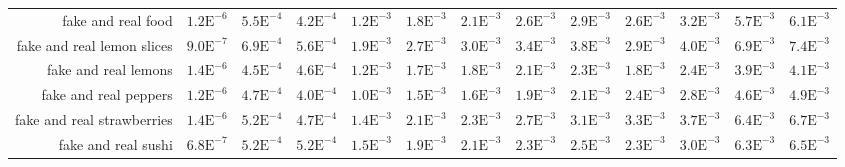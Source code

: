 \begin{landscape}
\begin{table}
\begin{tabularx}{\linewidth}{r | rr | rrrrrr | rrrr}
        fake and real food  & \footnotesize{$1.2\mathrm{E}^{-6}$}& \footnotesize{$5.5\mathrm{E}^{-4}$}& \footnotesize{$4.2\mathrm{E}^{-4}$}& \footnotesize{$1.2\mathrm{E}^{-3}$}& \footnotesize{$1.8\mathrm{E}^{-3}$}& \footnotesize{$2.1\mathrm{E}^{-3}$}& \footnotesize{$2.6\mathrm{E}^{-3}$}& \footnotesize{$2.9\mathrm{E}^{-3}$}& \footnotesize{$2.6\mathrm{E}^{-3}$}& \footnotesize{$3.2\mathrm{E}^{-3}$}& \footnotesize{$5.7\mathrm{E}^{-3}$}& \footnotesize{$6.1\mathrm{E}^{-3}$}\\
        fake and real lemon slices  & \footnotesize{$9.0\mathrm{E}^{-7}$}& \footnotesize{$6.9\mathrm{E}^{-4}$}& \footnotesize{$5.6\mathrm{E}^{-4}$}& \footnotesize{$1.9\mathrm{E}^{-3}$}& \footnotesize{$2.7\mathrm{E}^{-3}$}& \footnotesize{$3.0\mathrm{E}^{-3}$}& \footnotesize{$3.4\mathrm{E}^{-3}$}& \footnotesize{$3.8\mathrm{E}^{-3}$}& \footnotesize{$2.9\mathrm{E}^{-3}$}& \footnotesize{$4.0\mathrm{E}^{-3}$}& \footnotesize{$6.9\mathrm{E}^{-3}$}& \footnotesize{$7.4\mathrm{E}^{-3}$}\\
        fake and real lemons  & \footnotesize{$1.4\mathrm{E}^{-6}$}& \footnotesize{$4.5\mathrm{E}^{-4}$}& \footnotesize{$4.6\mathrm{E}^{-4}$}& \footnotesize{$1.2\mathrm{E}^{-3}$}& \footnotesize{$1.7\mathrm{E}^{-3}$}& \footnotesize{$1.8\mathrm{E}^{-3}$}& \footnotesize{$2.1\mathrm{E}^{-3}$}& \footnotesize{$2.3\mathrm{E}^{-3}$}& \footnotesize{$1.8\mathrm{E}^{-3}$}& \footnotesize{$2.4\mathrm{E}^{-3}$}& \footnotesize{$3.9\mathrm{E}^{-3}$}& \footnotesize{$4.1\mathrm{E}^{-3}$}\\
        fake and real peppers  & \footnotesize{$1.2\mathrm{E}^{-6}$}& \footnotesize{$4.7\mathrm{E}^{-4}$}& \footnotesize{$4.0\mathrm{E}^{-4}$}& \footnotesize{$1.0\mathrm{E}^{-3}$}& \footnotesize{$1.5\mathrm{E}^{-3}$}& \footnotesize{$1.6\mathrm{E}^{-3}$}& \footnotesize{$1.9\mathrm{E}^{-3}$}& \footnotesize{$2.1\mathrm{E}^{-3}$}& \footnotesize{$2.4\mathrm{E}^{-3}$}& \footnotesize{$2.8\mathrm{E}^{-3}$}& \footnotesize{$4.6\mathrm{E}^{-3}$}& \footnotesize{$4.9\mathrm{E}^{-3}$}\\
        fake and real strawberries  & \footnotesize{$1.4\mathrm{E}^{-6}$}& \footnotesize{$5.2\mathrm{E}^{-4}$}& \footnotesize{$4.7\mathrm{E}^{-4}$}& \footnotesize{$1.4\mathrm{E}^{-3}$}& \footnotesize{$2.1\mathrm{E}^{-3}$}& \footnotesize{$2.3\mathrm{E}^{-3}$}& \footnotesize{$2.7\mathrm{E}^{-3}$}& \footnotesize{$3.1\mathrm{E}^{-3}$}& \footnotesize{$3.3\mathrm{E}^{-3}$}& \footnotesize{$3.7\mathrm{E}^{-3}$}& \footnotesize{$6.4\mathrm{E}^{-3}$}& \footnotesize{$6.7\mathrm{E}^{-3}$}\\
        fake and real sushi  & \footnotesize{$6.8\mathrm{E}^{-7}$}& \footnotesize{$5.2\mathrm{E}^{-4}$}& \footnotesize{$5.2\mathrm{E}^{-4}$}& \footnotesize{$1.5\mathrm{E}^{-3}$}& \footnotesize{$1.9\mathrm{E}^{-3}$}& \footnotesize{$2.1\mathrm{E}^{-3}$}& \footnotesize{$2.3\mathrm{E}^{-3}$}& \footnotesize{$2.5\mathrm{E}^{-3}$}& \footnotesize{$2.3\mathrm{E}^{-3}$}& \footnotesize{$3.0\mathrm{E}^{-3}$}& \footnotesize{$6.3\mathrm{E}^{-3}$}& \footnotesize{$6.5\mathrm{E}^{-3}$}\\

\end{tabularx}
\end{table}
\end{landscape}
